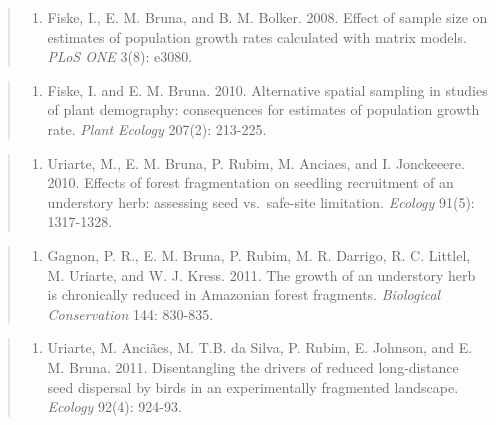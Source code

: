 \documentclass[
  man, donotrepeattitle,floatsintext]{apa6}
\providecommand{\tightlist}{%
  \setlength{\itemsep}{0pt}\setlength{\parskip}{0pt}}
\begin{document}
\begin{quote}
\begin{enumerate}
\def\labelenumi{\arabic{enumi}.}
\setcounter{enumi}{8}
\tightlist
\item
  Fiske, I., E. M. Bruna, and B. M. Bolker. 2008. Effect of sample size on estimates of population growth rates calculated with matrix models. \emph{PLoS ONE} 3(8): e3080.
\end{enumerate}
\end{quote}

\begin{quote}
\begin{enumerate}
\def\labelenumi{\arabic{enumi}.}
\setcounter{enumi}{9}
\tightlist
\item
  Fiske, I. and E. M. Bruna. 2010. Alternative spatial sampling in studies of plant demography: consequences for estimates of population growth rate. \emph{Plant Ecology} 207(2): 213-225.
\end{enumerate}
\end{quote}

\begin{quote}
\begin{enumerate}
\def\labelenumi{\arabic{enumi}.}
\setcounter{enumi}{10}
\tightlist
\item
  Uriarte, M., E. M. Bruna, P. Rubim, M. Anciaes, and I. Jonckeeere. 2010. Effects of forest fragmentation on seedling recruitment of an understory herb: assessing seed vs.~safe-site limitation. \emph{Ecology} 91(5): 1317-1328.
\end{enumerate}
\end{quote}

\begin{quote}
\begin{enumerate}
\def\labelenumi{\arabic{enumi}.}
\setcounter{enumi}{11}
\tightlist
\item
  Gagnon, P. R., E. M. Bruna, P. Rubim, M. R. Darrigo, R. C. Littlel, M. Uriarte, and W. J. Kress. 2011. The growth of an understory herb is chronically reduced in Amazonian forest fragments. \emph{Biological Conservation} 144: 830-835.
\end{enumerate}
\end{quote}

\begin{quote}
\begin{enumerate}
\def\labelenumi{\arabic{enumi}.}
\setcounter{enumi}{12}
\tightlist
\item
  Uriarte, M. Anciães, M. T.B. da Silva, P. Rubim, E. Johnson, and E. M. Bruna. 2011. Disentangling the drivers of reduced long-distance seed dispersal by birds in an experimentally fragmented landscape. \emph{Ecology} 92(4): 924-93.
\end{enumerate}
\end{quote}
\end{document}

